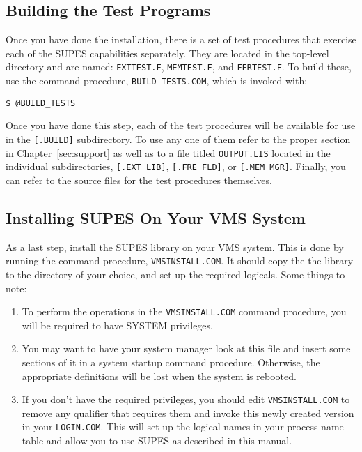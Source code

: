 \subsection{Building the Test Programs}
Once you have done the installation,
there is a set of test procedures that exercise each of the SUPES
capabilities separately.
They are located in the top-level directory
and are named:
\verb+EXTTEST.F+,
\verb+MEMTEST.F+,
and \verb+FFRTEST.F+\@.
To build these,
use the command procedure,
\verb+BUILD_TESTS.COM+\@,
which is invoked with:
\begin{verbatim}
$ @BUILD_TESTS
\end{verbatim}
Once you have done this step,
each of the test procedures will be available for use
in the
\verb+[.BUILD]+
subdirectory.
To use any one of them
refer to the
proper section in Chapter~\ref{sec:support}
as well as to
a file titled
\verb+OUTPUT.LIS+
located in the
individual subdirectories,
\verb+[.EXT_LIB]+,
\verb+[.FRE_FLD]+,
or \verb+[.MEM_MGR]+.
Finally,
you can refer
to the source files for the test procedures themselves.

\subsection{Installing SUPES On Your VMS System}
As a last step,
install the SUPES library on your VMS system.
This is done by
running the command procedure,
\verb+VMSINSTALL.COM+\@.
It should copy the
the library to the directory of your choice,
and set up the
required logicals.
Some things to note:
\begin{enumerate}
\item To perform the operations in the
      \verb+VMSINSTALL.COM+
      command procedure,
      you will be required to have SYSTEM privileges.

\item You may want to have your system manager look
      at this file and insert some sections of it in
      a system startup command procedure.
      Otherwise, the appropriate definitions will be lost
      when the system is rebooted.

\item If you don't have the required privileges,
      you should edit \verb+VMSINSTALL.COM+ to remove
      any qualifier that requires them and invoke this newly
      created version in your \verb+LOGIN.COM+.
      This will set up the logical names in your process
      name table and allow you to use SUPES as described in this manual.
\end{enumerate}

